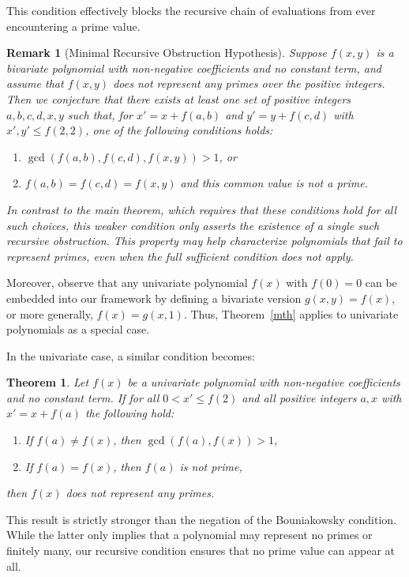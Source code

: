 \documentclass[a4paper,11pt]{article}
\newtheorem{theorem}{Theorem}
\newtheorem{remark}{Remark}
\begin{document}
	\noindent This condition effectively blocks the recursive chain of evaluations from ever encountering a prime value.
	
	\begin{remark}[Minimal Recursive Obstruction Hypothesis]
		Suppose $f(x,y)$ is a bivariate polynomial with non-negative coefficients and no constant term, and assume that $f(x,y)$ does not represent any primes over the positive integers. Then we conjecture that there exists at least one set of positive integers $a,b,c,d,x,y$ such that, for $x' = x + f(a,b)$ and $y' = y + f(c,d)$ with $x', y' \leq f(2,2)$, one of the following conditions holds:
		\begin{enumerate}
			\item $\gcd(f(a,b), f(c,d), f(x,y)) > 1$, or
			\item $f(a,b) = f(c,d) = f(x,y)$ and this common value is not a prime.
		\end{enumerate}
		In contrast to the main theorem, which requires that these conditions hold for \emph{all} such choices, this weaker condition only asserts the existence of a single such recursive obstruction. This property may help characterize polynomials that fail to represent primes, even when the full sufficient condition does not apply.
	\end{remark}
	
	
	Moreover, observe that any univariate polynomial $f(x)$ with $f(0) = 0$ can be embedded into our framework by defining a bivariate version $g(x, y) = f(x)$, or more generally, $f(x) = g(x, 1)$. Thus, Theorem~\ref{mth} applies to univariate polynomials as a special case.
	
	In the univariate case, a similar condition becomes:
	\begin{theorem}
		Let $f(x)$ be a univariate polynomial with non-negative coefficients and no constant term. If for all $0 < x' \leq f(2)$ and all positive integers $a, x$ with $x' = x + f(a)$ the following hold:
		\begin{enumerate}
			\item If $f(a) \neq f(x)$, then $\gcd(f(a), f(x)) > 1$,
			\item If $f(a) = f(x)$, then $f(a)$ is not prime,
		\end{enumerate}
		then $f(x)$ does not represent any primes.
	\end{theorem}
	
	\noindent This result is strictly stronger than the negation of the Bouniakowsky condition. While the latter only implies that a polynomial may represent no primes or finitely many, our recursive condition ensures that no prime value can appear at all.
	
\end{document}
